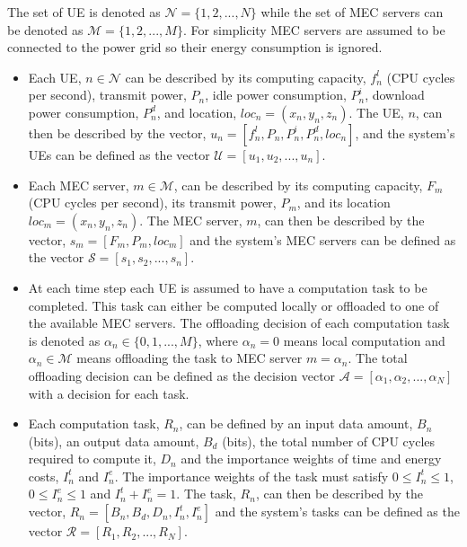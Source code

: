 \documentclass[conference]{IEEEtran}
\begin{document}
The set of \acrshort{UE} is denoted as $\mathcal{N} = \{1, 2, ..., N\}$ while the set of \acrshort{MEC} servers can be denoted as $\mathcal{M} = \{1, 2, ..., M\}$. For simplicity \acrshort{MEC} servers are assumed to be connected to the power grid so their energy consumption is ignored.
\begin{itemize}
    \item Each \acrshort{UE}, $n \in \mathcal{N}$ can be described by its computing capacity, $f_n^l$ (\acrshort{CPU} cycles per second), transmit power, $P_n$, idle power consumption, $P^i_n$, download power consumption, $P_n^d$, and location, $loc_n = (x_n, y_n, z_n)$. The UE, $n$, can then be described by the vector, $u_n = [f_n^l, P_n, P_n^i, P_n^d, loc_n]$, and the system's \acrshort{UE}s can be defined as the vector $\mathcal{U} = [u_1, u_2, ..., u_n]$.

    \item Each \acrshort{MEC} server, $m \in \mathcal{M}$, can be described by its computing capacity, $F_m$ (\acrshort{CPU} cycles per second), its transmit power, $P_m$, and its location $loc_m = (x_n, y_n, z_n)$. The \acrshort{MEC} server, $m$, can then be described by the vector, $s_m = [F_m, P_m, loc_m]$ and the system's \acrshort{MEC} servers can be defined as the vector $\mathcal{S} = [s_1, s_2, ..., s_n]$.

    \item At each time step each \acrshort{UE} is assumed to have a computation task to be completed. This task can either be computed locally or offloaded to one of the available \acrshort{MEC} servers. The offloading decision of each computation task is denoted as $\alpha_n \in \{0, 1, ..., M\}$, where $\alpha_n = 0$ means local computation and $\alpha_n \in \mathcal{M}$ means offloading the task to \acrshort{MEC} server $m = \alpha_n$. The total offloading decision can be defined as the decision vector $\mathcal{A} = [\alpha_1, \alpha_2, ..., \alpha_N]$ with a decision for each task.

    \item Each computation task, $R_n$, can be defined by an input data amount, $B_n$ (bits), an output data amount, $B_d$ (bits), the total number of \acrshort{CPU} cycles required to compute it, $D_n$ and the importance weights of time and energy costs, $I_n^t$ and $I_n^e$. The importance weights of the task must satisfy $0 \leq I_n^t \leq 1$, $0 \leq I_n^e \leq 1$ and $I_n^t + I_n^e = 1$. The task, $R_n$, can then be described by the vector, $R_n = [B_n, B_d, D_n, I_n^t, I_n^e]$ and the system's tasks can be defined as the vector $\mathcal{R} = [R_1, R_2, ..., R_N]$.


\end{itemize}
\end{document}
